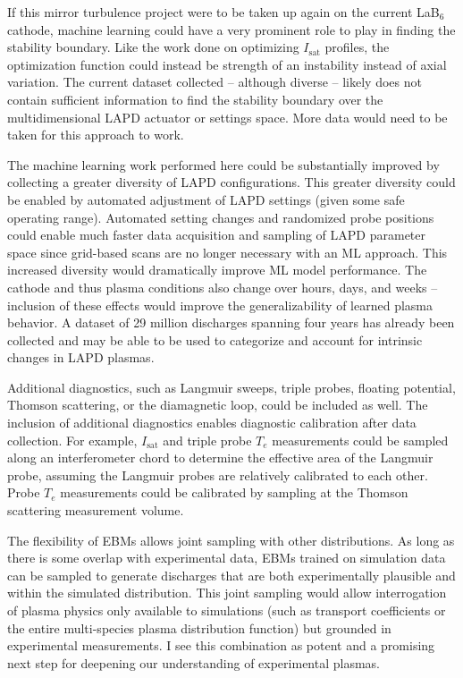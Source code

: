 If this mirror turbulence project were to be taken up again on the current LaB$_6$ cathode, machine learning could have a very prominent role to play in finding the stability boundary. Like the work done on optimizing $I_\text{sat}$ profiles, the optimization function could instead be strength of an instability instead of axial variation. The current dataset collected -- although diverse -- likely does not contain sufficient information to find the stability boundary over the multidimensional LAPD actuator or settings space. More data would need to be taken for this approach to work.

The machine learning work performed here could be substantially improved by collecting a greater diversity of LAPD configurations. This greater diversity could be enabled by automated adjustment of LAPD settings (given some safe operating range). Automated setting changes and randomized probe positions could enable much faster data acquisition and sampling of LAPD parameter space since grid-based scans are no longer necessary with an ML approach. This increased diversity would dramatically improve ML model performance. The cathode and thus plasma conditions also change over hours, days, and weeks -- inclusion of these effects would improve the generalizability of learned plasma behavior. A dataset of 29 million discharges spanning four years has already been collected and may be able to be used to categorize and account for intrinsic changes in LAPD plasmas.

Additional diagnostics, such as Langmuir sweeps, triple probes, floating potential, Thomson scattering, or the diamagnetic loop, could be included as well. The inclusion of additional diagnostics enables diagnostic calibration after data collection. For example, $I_\text{sat}$ and triple probe $T_e$ measurements could be sampled along an interferometer chord to determine the effective area of the Langmuir probe, assuming the Langmuir probes are relatively calibrated to each other. Probe $T_e$ measurements could be calibrated by sampling at the Thomson scattering measurement volume. 

The flexibility of EBMs allows joint sampling with other distributions. As long as there is some overlap with experimental data, EBMs trained on simulation data can be sampled to generate discharges that are both experimentally plausible and within the simulated distribution. This joint sampling would allow interrogation of plasma physics only available to simulations (such as transport coefficients or the entire multi-species plasma distribution function) but grounded in experimental measurements. I see this combination as potent and a promising next step for deepening our understanding of experimental plasmas.

